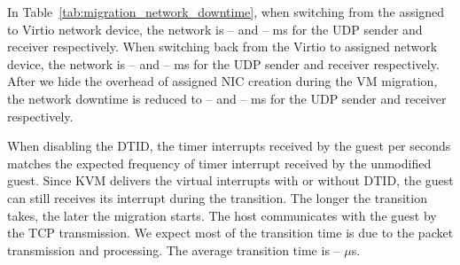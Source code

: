 In Table~\ref{tab:migration_network_downtime}, when switching
from the assigned to Virtio network device, the network is --
and -- ms for the UDP sender and receiver respectively. When
switching back from the Virtio to assigned network device, the
network is -- and -- ms for the UDP sender and receiver
respectively. After we hide the overhead of assigned NIC
creation during the VM migration, the network downtime is
reduced to -- and -- ms for the UDP sender and receiver
respectively.

When disabling the DTID, the timer interrupts received by the
guest per seconds matches the expected frequency of timer
interrupt received by the unmodified guest. Since KVM delivers
the virtual interrupts with or without DTID, the guest can
still receives its interrupt during the transition. The longer
the transition takes, the later the migration starts. The host
communicates with the guest by the TCP transmission. We expect
most of the transition time is due to the packet transmission
and processing. The average transition time is -- $\mu$s.

